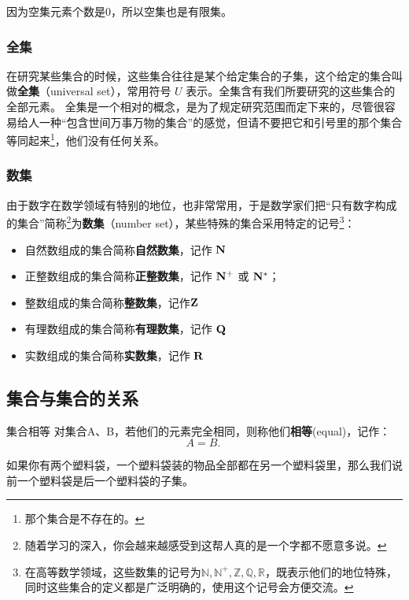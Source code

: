 因为空集元素个数是0，所以空集也是有限集。

\subsubsection{全集}

在研究某些集合的时候，这些集合往往是某个给定集合的子集，这个给定的集合叫做\textbf{全集}（universal set），常用符号 $U$ 表示。全集含有我们所要研究的这些集合的全部元素。
全集是一个相对的概念，是为了规定研究范围而定下来的，尽管很容易给人一种“包含世间万事万物的集合”的感觉，但请不要把它和引号里的那个集合等同起来\footnote{那个集合是不存在的。}，他们没有任何关系。

\subsubsection{数集}

由于数字在数学领域有特别的地位，也非常常用，于是数学家们把“只有数字构成的集合”简称\footnote{随着学习的深入，你会越来越感受到这帮人真的是一个字都不愿意多说。}为\textbf{数集}（number set），某些特殊的集合采用特定的记号\footnote{在高等数学领域，这些数集的记号为$\mathbb{N,N^+,Z,Q,R}$，既表示他们的地位特殊，同时这些集合的定义都是广泛明确的，使用这个记号会方便交流。}：
\begin{itemize}
\item 自然数组成的集合简称\textbf{自然数集}，记作 ${\rm \mathbf{N}}$
\item 正整数组成的集合简称\textbf{正整数集}，记作 ${\rm \mathbf{N^+}}$ 或 ${\rm \mathbf{N^*}}$； 
\item 整数组成的集合简称\textbf{整数集}，记作${\rm \mathbf{Z}}$
\item 有理数组成的集合简称\textbf{有理数集}，记作 ${\rm \mathbf{Q}}$
\item 实数组成的集合简称\textbf{实数集}，记作 ${\rm \mathbf{R}}$
\end{itemize}


\subsection{集合与集合的关系}

\begin{definition}{集合相等}
对集合A、B，若他们的元素完全相同，则称他们\textbf{相等}(equal)，记作：
\begin{equation}
A=B.~
\end{equation}
\end{definition}

如果你有两个塑料袋，一个塑料袋装的物品全部都在另一个塑料袋里，那么我们说前一个塑料袋是后一个塑料袋的子集。

